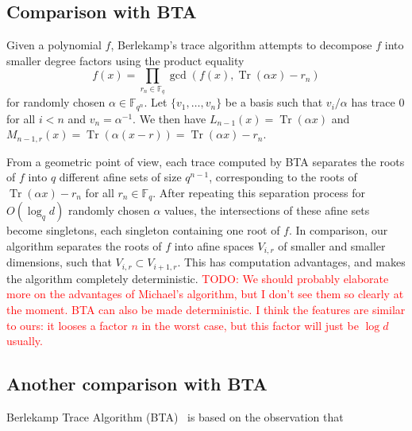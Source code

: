 \documentclass{sig-alternate}
\newcommand{\ff}[1]{\mathbb{F}_{#1}}
\newcommand{\fq}{\ff{q}}
\newcommand{\fqn}{\ff{q^n}}
\newcommand{\fctdegree}{d}
\newcommand{\basefsize}{q}
\newcommand{\extfdegree}{n}
\DeclareMathOperator{\Tr}{Tr}
\newcounter{algo}
\newcommand{\todo}[1]{\textcolor{red}{TODO: #1}}
\begin{document}
\subsection{Comparison with BTA}

Given a polynomial $f$, Berlekamp's trace algorithm attempts to decompose $f$ into smaller degree factors using the product equality
$$f(x)=\prod_{r_n\in\fq}\gcd\left(f(x),\Tr(\alpha x)-r_n\right)$$
for randomly chosen $\alpha\in\fqn$.
%
Let $\{v_1,\ldots,v_{\extfdegree}\}$ be a basis such that $v_i/\alpha$ has trace 0 for all $i<\extfdegree$ and $v_\extfdegree=\alpha^{-1}$. We then have $L_{\extfdegree-1}(x)=\Tr(\alpha x)$ and $M_{\extfdegree-1,r}(x)=\Tr(\alpha (x-r))=\Tr(\alpha x)-r_\extfdegree$.

From a geometric point of view, each trace computed by BTA separates the roots of $f$ into $q$ different afine sets of size $\basefsize^{\extfdegree-1}$, corresponding to the roots of $\Tr(\alpha x)-r_\extfdegree$ for all $r_\extfdegree\in\fq$. After repeating this separation process for $O(\log_\basefsize\fctdegree)$  randomly chosen $\alpha$ values, the intersections of these afine sets become singletons, each singleton containing one root of $f$. 
%
In comparison, our algorithm separates the roots of $f$ into afine spaces $V_{i,r}$ of smaller and smaller dimensions, such that $V_{i,r}\subset V_{i+1,r}$. This has computation advantages, and makes the algorithm completely deterministic.
%
\todo{We should probably elaborate more on the advantages of Michael's algorithm, but I don't see them so clearly at the moment. BTA can also be made deterministic. I think the features are similar to ours: it looses a factor $n$ in the worst case, but this factor will just be $\log d$ usually.}


\subsection{Another comparison with BTA}


Berlekamp Trace Algorithm (BTA)~\cite{berl70} is based on the observation that
\end{document}
